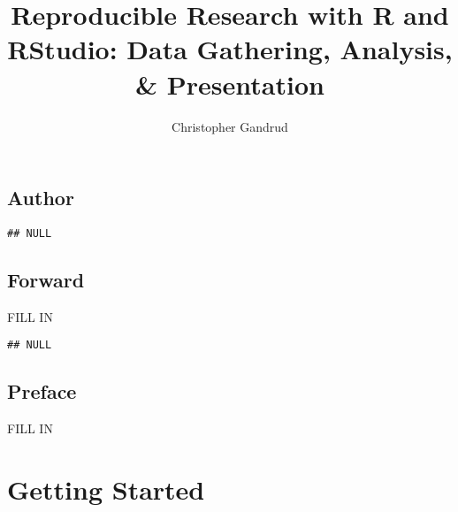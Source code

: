 \documentclass[ChapterTOCs,krantz1]{krantz}\usepackage{graphicx, color}
\makeatletter
\newenvironment{kframe}{%
 \def\at@end@of@kframe{}%
 \ifinner\ifhmode%
  \def\at@end@of@kframe{\end{minipage}}%
  \begin{minipage}{\columnwidth}%
 \fi\fi%
 \def\FrameCommand##1{\hskip\@totalleftmargin \hskip-\fboxsep
 \colorbox{shadecolor}{##1}\hskip-\fboxsep
     \hskip-\linewidth \hskip-\@totalleftmargin \hskip\columnwidth}%
 \MakeFramed {\advance\hsize-\width
   \@totalleftmargin\z@ \linewidth\hsize
   \@setminipage}}%
 {\par\unskip\endMakeFramed%
 \at@end@of@kframe}
\newenvironment{knitrout}{}{} %
\makeatother
\begin{document}
\title{Reproducible Research with R and RStudio: Data Gathering, Analysis, \& Presentation}

\author{Christopher Gandrud}

\maketitle

\frontmatter

\chapter*{Author}


\begin{knitrout}
\color{fgcolor}\begin{kframe}
\begin{verbatim}
## NULL
\end{verbatim}
\end{kframe}
\end{knitrout}


\chapter*{Forward}

FILL IN
\begin{knitrout}
\color{fgcolor}\begin{kframe}
\begin{verbatim}
## NULL
\end{verbatim}
\end{kframe}
\end{knitrout}


\chapter*{Preface}

FILL IN


\listoffigures
\listoftables
\tableofcontents

\mainmatter

\setcounter{page}{1}

\part{Getting Started}
\end{document}
